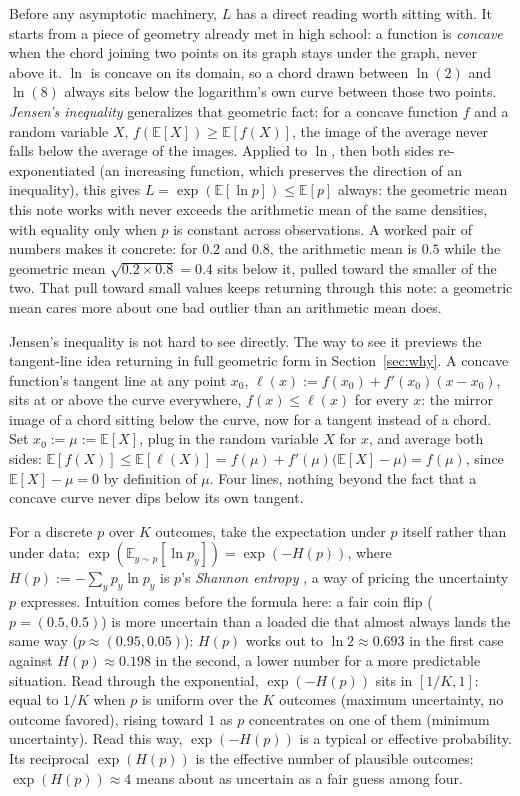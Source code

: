 \documentclass[11pt]{article}
\begin{document}
Before any asymptotic machinery, $L$ has a direct reading worth sitting
with. It starts from a piece of geometry already met in high
school: a function is \emph{concave} when the chord joining two points
on its graph stays under the graph, never above it. $\ln$ is concave
on its domain, so a chord drawn between $\ln(2)$ and $\ln(8)$ always
sits below the logarithm's own curve between those two points.
\emph{Jensen's inequality} generalizes that geometric fact: for a
concave function $f$ and a random variable $X$, $f(\mathbb E[X]) \ge
\mathbb E[f(X)]$, the image of the average never falls below the
average of the images. Applied to $\ln$, then both sides
re-exponentiated (an increasing function, which preserves the
direction of an inequality), this gives $L = \exp(\mathbb E[\ln p])
\le \mathbb E[p]$ always: the geometric mean this note works with
never exceeds the arithmetic mean of the same densities, with equality
only when $p$ is constant across observations. A worked pair of
numbers makes it concrete: for $0.2$ and $0.8$, the arithmetic mean is
$0.5$ while the geometric mean $\sqrt{0.2 \times 0.8} = 0.4$ sits
below it, pulled toward the smaller of the two. That pull toward small
values keeps returning through this note: a geometric mean cares more
about one bad outlier than an arithmetic mean does.

Jensen's inequality is not hard to see directly. The way to see it
previews the tangent-line idea returning in full geometric form in
Section~\ref{sec:why}. A concave function's tangent line at any point
$x_0$, $\ell(x) := f(x_0) + f'(x_0)(x-x_0)$, sits at or above the curve
everywhere, $f(x) \le \ell(x)$ for every $x$: the mirror image of a
chord sitting below the curve, now for a tangent instead of a chord.
Set $x_0 := \mu := \mathbb E[X]$, plug in the random variable $X$ for
$x$, and average both sides: $\mathbb E[f(X)] \le \mathbb E[\ell(X)] =
f(\mu) + f'(\mu)\big(\mathbb E[X]-\mu\big) = f(\mu)$, since $\mathbb
E[X]-\mu = 0$ by definition of $\mu$. Four lines, nothing beyond the
fact that a concave curve never dips below its own tangent.

For a discrete $p$ over $K$ outcomes, take the expectation under $p$
itself rather than under data: $\exp(\mathbb E_{y \sim p}[\ln p_y]) =
\exp(-H(p))$, where $H(p) := -\sum_y p_y \ln p_y$ is $p$'s
\emph{Shannon entropy} \citep{mackay2003information}, a way of pricing
the uncertainty $p$ expresses. Intuition comes before the formula
here: a fair coin flip ($p = (0.5, 0.5)$) is more uncertain than a
loaded die that almost always lands the same way ($p \approx (0.95,
0.05)$): $H(p)$ works out to $\ln 2 \approx 0.693$ in the first
case against $H(p) \approx 0.198$ in the second, a lower number for a
more predictable situation. Read through the exponential,
$\exp(-H(p))$ sits in $[1/K, 1]$: equal to $1/K$ when $p$ is uniform
over the $K$ outcomes (maximum uncertainty, no outcome favored), rising
toward $1$ as $p$ concentrates on one of them (minimum uncertainty).
Read this way, $\exp(-H(p))$ is a typical or effective probability.
Its reciprocal $\exp(H(p))$ is the effective number of plausible
outcomes: $\exp(H(p)) \approx 4$ means about as uncertain as a fair
guess among four.
\end{document}
